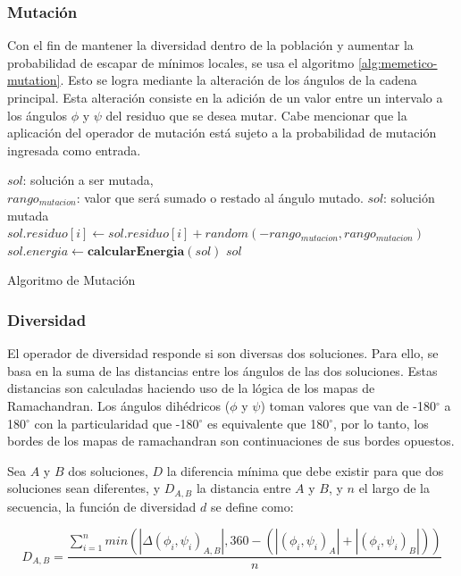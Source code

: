 \subsubsection{Mutación}
Con el fin de mantener la diversidad dentro de la población y aumentar la probabilidad de escapar de mínimos locales, se usa el algoritmo \ref{alg:memetico-mutation}. Esto se logra mediante la alteración de los ángulos de la cadena principal. Esta alteración consiste en la adición de un valor entre un intervalo a los ángulos $\phi$ y $\psi$ del residuo que se desea mutar. Cabe mencionar que la aplicación del operador de mutación está sujeto a la probabilidad de mutación ingresada como entrada.
\\[25pt]
\begin{algorithm}[H]
	\begin{algorithmic}[1]
		\REQUIRE$sol$: solución a ser mutada, \\ \hspace{1.2cm} $rango_{mutacion}$: valor que será sumado o restado al ángulo mutado.
		\ENSURE $sol$: solución mutada
    		    \STATE $sol.residuo[i] \gets sol.residuo[i] + random(-rango_{mutacion}, rango_{mutacion})$
    		\ENDIF
		\ENDFOR
		\STATE $sol.energia \gets \textbf{calcularEnergia}(sol)$
		\RETURN $sol$
	\end{algorithmic}
	\caption{Algoritmo de Mutación}
	\label{alg:memetico-mutation}
\end{algorithm}

\subsubsection{Diversidad}
El operador de diversidad responde si son diversas dos soluciones. Para ello, se basa en la suma de las distancias entre los ángulos de las dos soluciones. Estas distancias son calculadas haciendo uso de la lógica de los mapas de Ramachandran. Los ángulos dihédricos ($\phi$ y $\psi$) toman valores que van de -180$^\circ$ a 180$^\circ$ con la particularidad que -180$^\circ$ es equivalente que 180$^\circ$, por lo tanto, los bordes de los mapas de ramachandran son continuaciones de sus bordes opuestos.

Sea $A$ y $B$ dos soluciones, $D$ la diferencia mínima que debe existir para que dos soluciones sean diferentes, y $D_{A,B}$ la distancia entre $A$ y $B$, y $n$ el largo de la secuencia, la función de diversidad $d$ se define como:

\begin{equation}
    D_{A,B} = \frac{\sum_{i=1}^{n}min(|\Delta(\phi_i,\psi_i)_{A,B}|,360-(|(\phi_i,\psi_i)_{A}|+|(\phi_i,\psi_i)_{B}|))}{n}
\end{equation}

